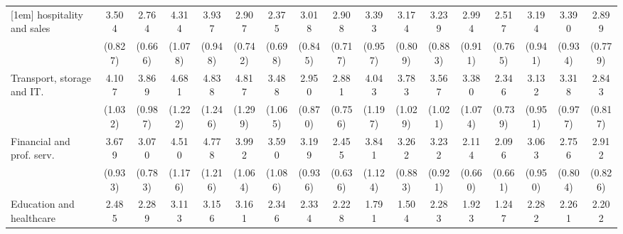 {\begin{tabular}{l*{16}{c}}
[1em]
hospitality and sales&       3.504\sym{***}&       2.764\sym{***}&       4.314\sym{***}&       3.937\sym{***}&       2.907\sym{***}&       2.375\sym{**} &       3.018\sym{***}&       2.908\sym{***}&       3.393\sym{***}&       3.174\sym{***}&       3.239\sym{***}&       2.994\sym{***}&       2.517\sym{**} &       3.194\sym{***}&       3.390\sym{***}&       2.899\sym{***}\\
                    &     (0.827)         &     (0.666)         &     (1.078)         &     (0.948)         &     (0.742)         &     (0.698)         &     (0.845)         &     (0.717)         &     (0.957)         &     (0.809)         &     (0.883)         &     (0.911)         &     (0.765)         &     (0.941)         &     (0.934)         &     (0.779)         \\
[1em]
Transport, storage and IT.&       4.107\sym{***}&       3.869\sym{***}&       4.681\sym{***}&       4.838\sym{***}&       4.817\sym{***}&       3.488\sym{***}&       2.950\sym{***}&       2.881\sym{***}&       4.043\sym{***}&       3.783\sym{***}&       3.567\sym{***}&       3.380\sym{***}&       2.346\sym{**} &       3.132\sym{***}&       3.318\sym{***}&       2.843\sym{***}\\
                    &     (1.032)         &     (0.987)         &     (1.222)         &     (1.246)         &     (1.299)         &     (1.065)         &     (0.870)         &     (0.756)         &     (1.197)         &     (1.029)         &     (1.021)         &     (1.074)         &     (0.739)         &     (0.951)         &     (0.977)         &     (0.817)         \\
[1em]
Financial and prof. serv.&       3.679\sym{***}&       3.070\sym{***}&       4.510\sym{***}&       4.778\sym{***}&       3.992\sym{***}&       3.590\sym{***}&       3.199\sym{***}&       2.455\sym{***}&       3.841\sym{***}&       3.262\sym{***}&       3.232\sym{***}&       2.114\sym{*}  &       2.096\sym{*}  &       3.063\sym{***}&       2.756\sym{***}&       2.912\sym{***}\\
                    &     (0.933)         &     (0.783)         &     (1.176)         &     (1.216)         &     (1.064)         &     (1.086)         &     (0.936)         &     (0.636)         &     (1.124)         &     (0.883)         &     (0.921)         &     (0.660)         &     (0.661)         &     (0.950)         &     (0.804)         &     (0.826)         \\
[1em]
Education and healthcare&       2.485\sym{***}&       2.289\sym{**} &       3.113\sym{***}&       3.156\sym{***}&       3.161\sym{***}&       2.346\sym{*}  &       2.334\sym{**} &       2.228\sym{**} &       1.791         &       1.504         &       2.283\sym{*}  &       1.923         &       1.247         &       2.282\sym{*}  &       2.261\sym{*}  &       2.202\sym{*}  \\

\end{tabular}}
